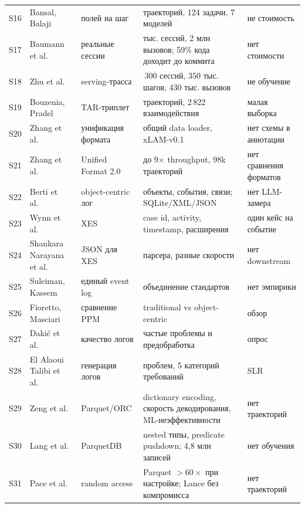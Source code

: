 \documentclass[11pt,a4paper]{article}
\begin{document}
{\begin{longtable}{@{}>{\raggedright\arraybackslash}p{0.55cm}>{\raggedright\arraybackslash}p{3.0cm}>{\raggedright\arraybackslash}p{2.7cm}>{\raggedright\arraybackslash}p{4.3cm}>{\raggedright\arraybackslash}p{3.0cm}@{}}
S16 & Bansal, Balaji~\cite{bansal2026odt} & 9 полей на шаг & 558 траекторий, 124 задачи, 7 моделей & не стоимость \\
S17 & Baumann et al.~\cite{baumann2026swechat} & реальные сессии & 18 тыс. сессий, 2 млн вызовов; 59\% кода доходит до коммита & нет стоимости \\
S18 & Zhu et al.~\cite{zhu2026tracelab} & serving-трасса & 4\,300 сессий, 350 тыс. шагов, 430 тыс. вызовов & не обучение \\
S19 & Bouzenia, Pradel~\cite{bouzenia2025tar} & TAR-триплет & 120 траекторий, 2\,822 взаимодействия & малая выборка \\
S20 & Zhang et al.~\cite{zhang2024agentohana} & унификация формата & общий data loader, xLAM-v0.1 & нет схемы в аннотации \\
S21 & Zhang et al.~\cite{zhang2025actionstudio} & Unified Format 2.0 & до 9$\times$ throughput, 98k траекторий & нет сравнения форматов \\
S22 & Berti et al.~\cite{berti2024ocel} & object-centric лог & объекты, события, связи; SQLite/XML/JSON & нет LLM-замера \\
S23 & Wynn et al.~\cite{wynn2024xes} & XES & case id, activity, timestamp, расширения & один кейс на событие \\
S24 & Shankara Narayana et al.~\cite{shankara2020jxes} & JSON для XES & 4 парсера, разные скорости & нет downstream \\
S25 & Suleiman, Kassem~\cite{suleiman2024extended} & единый event log & объединение стандартов & нет эмпирики \\
S26 & Fioretto, Masciari~\cite{fioretto2025ppm} & сравнение PPM & traditional vs object-centric & обзор \\
S27 & Dakić et al.~\cite{dakic2023quality} & качество логов & частые проблемы и предобработка & опрос \\
S28 & El Alaoui Talibi et al.~\cite{elalaoui2026eventlog} & генерация логов & 29 проблем, 5 категорий требований & SLR \\
S29 & Zeng et al.~\cite{zeng2023columnar} & Parquet/ORC & dictionary encoding, скорость декодирования, ML-неэффективности & нет траекторий \\
S30 & Lang et al.~\cite{lang2025parquetdb} & ParquetDB & nested типы, predicate pushdown; 4,8 млн записей & нет обучения \\
S31 & Pace et al.~\cite{pace2025lance} & random access & Parquet $>60\times$ при настройке; Lance без компромисса & нет траекторий \\

\end{longtable}}
\end{document}

